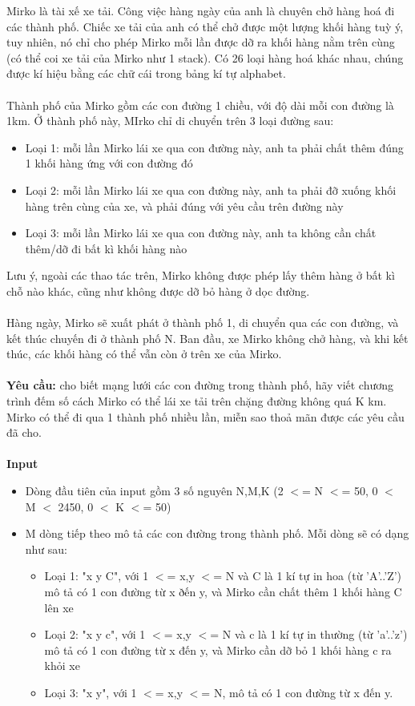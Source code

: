 

Mirko là tài xế xe tải. Công việc hàng ngày của anh là chuyên chở hàng hoá đi các thành phố. Chiếc xe tải của anh có thể chở được một lượng khối hàng tuỳ ý, tuy nhiên, nó chỉ cho phép Mirko mỗi lần được dỡ ra khối hàng nằm trên cùng (có thể coi xe tải của Mirko như 1 stack). Có 26 loại hàng hoá khác nhau, chúng được kí hiệu bằng các chữ cái trong bảng kí tự alphabet.
\\
\\Thành phố của Mirko gồm các con đường 1 chiều, với độ dài mỗi con đường là 1km. Ở thành phố này, MIrko chỉ di chuyển trên 3 loại đường sau:
\begin{itemize}
	\item Loại 1: mỗi lần Mirko lái xe qua con đường này, anh ta phải chất thêm đúng 1 khối hàng ứng với con đường đó
	\item Loại 2: mỗi lần Mirko lái xe qua con đường này, anh ta phải đỡ xuống khối hàng trên cùng của xe, và phải đúng với yêu cầu trên đường này
	\item Loại 3: mỗi lần Mirko lái xe qua con đường này, anh ta không cần chất thêm/dỡ đi bất kì khối hàng nào
\end{itemize}

Lưu ý, ngoài các thao tác trên, Mirko không được phép lấy thêm hàng ở bất kì chỗ nào khác, cũng như không được dỡ bỏ hàng ở dọc đường.
\\
\\Hàng ngày, Mirko sẽ xuất phát ở thành phố 1, di chuyển qua các con đường, và kết thúc chuyến đi ở thành phố N. Ban đầu, xe Mirko không chở hàng, và khi kết thúc, các khối hàng có thể vẫn còn ở trên xe của Mirko.
\\
\\\textbf{Yêu cầu:} cho biết mạng lưới các con đường trong thành phố, hãy viết chương trình đếm số cách Mirko có thể lái xe tải trên chặng đường không quá K km. Mirko có thể đi qua 1 thành phố nhiều lần, miễn sao thoả mãn được các yêu cầu đã cho.
\\
\\\textbf{Input}
\begin{itemize}
	\item Dòng đầu tiên của input gồm 3 số nguyên N,M,K (2 $<$= N $<$= 50, 0 $<$ M $<$ 2450, 0 $<$ K $<$= 50)
	\item M dòng tiếp theo mô tả các con đường trong thành phố. Mỗi dòng sẽ có dạng như sau:
\begin{itemize}
	\item Loại 1: "x y C", với 1 $<$= x,y $<$= N và C là 1 kí tự in hoa (từ 'A'..'Z') mô tả có 1 con đường từ x ðến y, và Mirko cần chất thêm 1 khối hàng C lên xe
	\item Loại 2: "x y c", với 1 $<$= x,y $<$= N và c là 1 kí tự in thường (từ 'a'..'z') mô tả có 1 con đường từ x đến y, và Mirko cần dỡ bỏ 1 khối hàng c ra khỏi xe
	\item Loại 3: "x y", với 1 $<$= x,y $<$= N, mô tả có 1 con đường từ x đến y.
\end{itemize}
\end{itemize}

